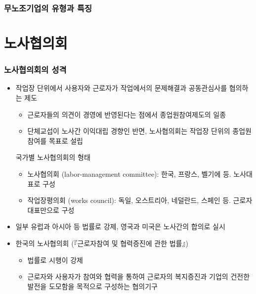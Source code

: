 \documentclass[aspectratio=169,xcolor=dvipsnames,handout]{beamer}
\begin{document}
\begin{frame}
    \frametitle{무노조기업의 유형과 특징}
    \begin{table}
        \centering
        \resizebox{.8\textwidth}{!}{\relax
            
        }
    \end{table}
\end{frame}

\section{노사협의회}

\begin{frame}[allowframebreaks]
    \frametitle{노사협의회의 성격}
    \begin{itemize}[<+->]
        \item 작업장 단위에서 사용자와 근로자가 작업에서의 문제해결과 공동관심사를 협의하는 제도
        \begin{itemize}
            \item 근로자들의 의견이 경영에 반영된다는 점에서 종업원참여제도의 일종
            \item 단체교섭이 노사간 이익대립 경향인 반면, 노사협의회는 작업장 단위의 종업원 참여를 목표로 설립
        \end{itemize}
        \begin{exampleblock}{국가별 노사협의회의 형태}
            \begin{itemize}
                \item 노사협의회 (labor-management committee): \linebreak 한국, 프랑스, 벨기에 등. 노사대표로 구성
                \item 작업장평의회 (works council): \linebreak 독일, 오스트리아, 네덜란드, 스페인 등. 근로자 대표만으로 구성
            \end{itemize}
        \end{exampleblock}
        \item 일부 유럽과 아시아 등 법률로 강제, 영국과 미국은 노사간의 합의로 실시
        \item 한국의 노사협의회 (『근로자참여 및 협력증진에 관한 법률』) 
        \begin{itemize}
            \item 법률로 시행이 강제
            \item 근로자와 사용자가 참여와 협력을 통하여 근로자의 복지증진과 기업의 건전한 발전을 도모함을 목적으로 구성하는 협의기구
        \end{itemize}
    \end{itemize}
\end{frame}
\end{document}

